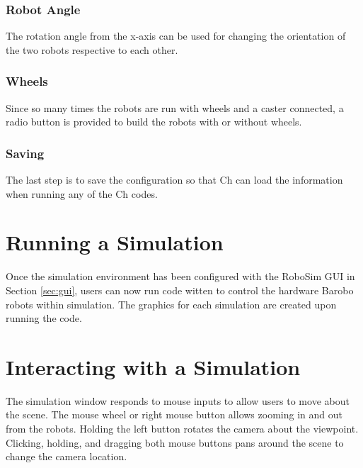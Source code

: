 \documentclass{article}
\begin{document}
\subsubsection{Robot Angle}
The rotation angle from the x-axis can be used for changing the orientation of the two robots
respective to each other. 

\subsubsection{Wheels}
Since so many times the robots are run with wheels and a caster connected, a radio button is provided
to build the robots with or without wheels.

\subsubsection{Saving}
The last step is to save the configuration so that Ch can load the information when running any
of the Ch codes.

\section{Running a Simulation}
Once the simulation environment has been configured with the RoboSim GUI in Section \ref{sec:gui}, users
can now run code witten to control the hardware Barobo robots within simulation.  The graphics for
each simulation are created upon running the code.

\section{Interacting with a Simulation}
The simulation window responds to mouse inputs to allow users to move about the scene.
The mouse wheel or right mouse button allows zooming in and out from the robots.  Holding the 
left button rotates the camera about the viewpoint.  Clicking, holding, and dragging both mouse
buttons pans around the scene to change the camera location.
\end{document}
